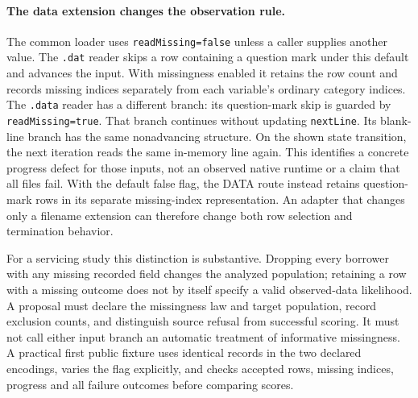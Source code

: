 \paragraph{The data extension changes the observation rule.}
The common loader uses \texttt{readMissing=false} unless a caller supplies another
value. The \texttt{.dat} reader skips a row containing a question mark under this
default and advances the input. With missingness enabled it retains the row count and
records missing indices separately from each variable's ordinary category indices.
The \texttt{.data} reader has a different branch: its question-mark skip is guarded
by \texttt{readMissing=true}. That branch continues without updating
\texttt{nextLine}. Its blank-line branch has the same nonadvancing structure. On the
shown state transition, the next iteration reads the same in-memory line again.
This identifies a concrete progress defect for those inputs, not an observed native
runtime or a claim that all files fail. With the default false flag, the DATA route
instead retains question-mark rows in its separate missing-index representation.
An adapter that changes only a filename extension can therefore change both row
selection and termination behavior.~\citep{exec28_blip_helpers}

For a servicing study this distinction is substantive. Dropping every borrower with
any missing recorded field changes the analyzed population; retaining a row with a
missing outcome does not by itself specify a valid observed-data likelihood. A
proposal must declare the missingness law and target population, record exclusion
counts, and distinguish source refusal from successful scoring. It must not call
either input branch an automatic treatment of informative missingness. A practical
first public fixture uses identical records in the two declared encodings, varies
the flag explicitly, and checks accepted rows, missing indices, progress and all
failure outcomes before comparing scores.~\citep{exec28_blip_helpers}

